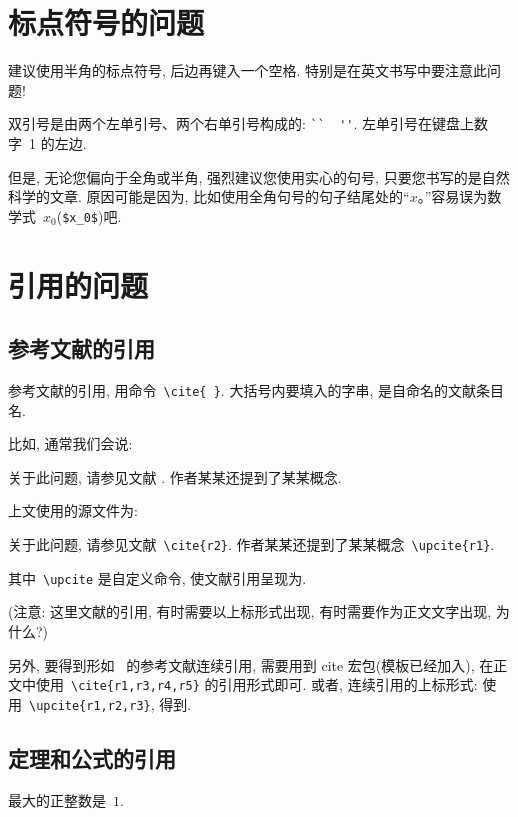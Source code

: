 \documentclass[forprint]{WHUBachelor}
\begin{document}
\section{标点符号的问题}

建议使用半角的标点符号, 后边再键入一个空格. 特别是在英文书写中要注意此问题!

双引号是由两个左单引号、两个右单引号构成的: \verb|``  ''|. 左单引号在键盘上数字~1 的左边.

但是, 无论您偏向于全角或半角, 强烈建议您使用实心的句号, 只要您书写的是自然科学的文章.
原因可能是因为, 比如使用全角句号的句子结尾处的``$x$。''容易误为数学式~$x_0$(\verb|$x_0$|)吧.



\section{引用的问题}


\subsection{参考文献的引用}

参考文献的引用, 用命令~\verb|\cite{ }|. 大括号内要填入的字串, 是自命名的文献条目名.

比如, 通常我们会说:

 {\kaishu
关于此问题, 请参见文献 \cite{r2}. 作者某某还提到了某某概念.}


上文使用的源文件为:

 {\kaishu
关于此问题, 请参见文献~\verb|\cite{r2}|. 作者某某还提到了某某概念~\verb|\upcite{r1}|.
}

其中~\verb|\upcite| 是自定义命令, 使文献引用呈现为.

({\heiti 注意:} {\kaishu 这里文献的引用, 有时需要以上标形式出现, 有时需要作为正文文字出现, 为什么?})

另外, 要得到形如~\cite{r1,r3,r4,r5} 的参考文献连续引用, 需要用到 cite 宏包(模板已经加入),
在正文中使用~\verb|\cite{r1,r3,r4,r5}| 的引用形式即可.
或者, 连续引用的上标形式: 使用~\verb|\upcite{r1,r2,r3}|, 得到.

\subsection{定理和公式的引用}

\begin{theorem}[谁发现的]\label{th-abcd}
最大的正整数是~$1$.
\end{theorem}
\end{document}
